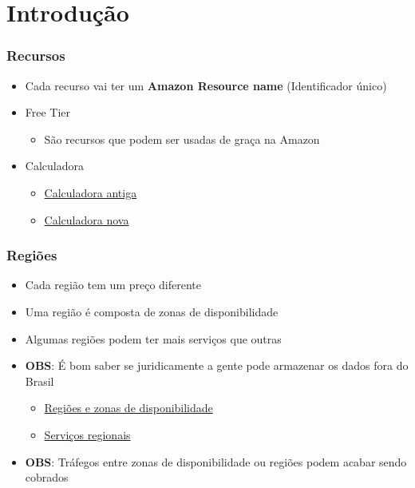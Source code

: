 \section{Introdução}

\begin{frame}
	\frametitle{Recursos}
	\begin{itemize}
		\item Cada recurso vai ter um \textbf{Amazon Resource name} (Identificador único)
		\item Free Tier
			\begin{itemize}
				\item São recursos que podem ser usadas de graça na Amazon
			\end{itemize}
		\item Calculadora
			\begin{itemize}
				\item \href{https://calculator.s3.amazonaws.com/index.html}{Calculadora antiga}
				\item \href{https://calculator.aws/}{Calculadora nova}
			\end{itemize}
	\end{itemize}
\end{frame}

\begin{frame}
	\frametitle{Regiões}
	\begin{itemize}
		\item Cada região tem um preço diferente
		\item Uma região é composta de zonas de disponibilidade
		\item Algumas regiões podem ter mais serviços que outras
		\item \textbf{OBS}: É bom saber se juridicamente a gente pode armazenar os dados fora do Brasil
			\begin{itemize}
				\item \href{https://aws.amazon.com/pt/about-aws/global-infrastructure/regions_az/}{Regiões e zonas de disponibilidade}
				\item \href{https://aws.amazon.com/pt/about-aws/global-infrastructure/regional-product-services/}{Serviços regionais}
			\end{itemize}
		\item \textbf{OBS}: Tráfegos entre zonas de disponibilidade ou regiões podem acabar sendo cobrados
	\end{itemize}
\end{frame}

